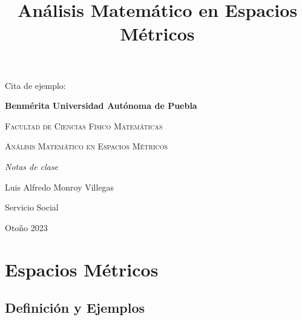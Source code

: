 \documentclass[oneside]{book} %
\theoremstyle{Teorema}
\theoremstyle{Ejemplos}
\theoremstyle{[Obs]}
\renewcommand{\{}{\left\lbrace} %
\renewcommand{\}}{\right\rbrace} %
\begin{document}
	\color{white} 
	Cita de ejemplo: \cite{DUMMY:1}
	\color{black} \newpage

	\begin{titlepage}
		\centering
		{\bfseries\LARGE Benmérita Universidad Autónoma de Puebla \par}
		\vspace{1cm}
		{\scshape\Large Facultad de Ciencias Físico Matemáticas \par}
		\vspace{3cm}
		{\scshape\Huge Análisis Matemático en Espacios Métricos \par}
		\vspace{3cm}
		{\itshape\Large Notas de clase \par}
		\vfill
		{\Large Luis Alfredo Monroy Villegas \par}
		{\Large Servicio Social \par}
		\vfill
		{\Large Otoño 2023 \par}
	\end{titlepage}

	\tableofcontents
	\justify
	\title{Análisis Matemático en Espacios Métricos}

	\chapter{Espacios Métricos}

		\section{Definición y Ejemplos}
\end{document}
